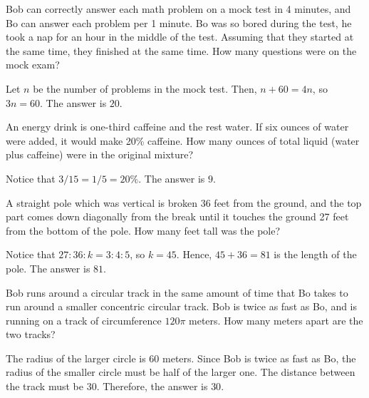 \begin{problem}
Bob can correctly answer each math problem on a mock test in 4 minutes, and Bo can answer each problem per 1 minute. Bo was so bored during the test, he took a nap for an hour in the middle of the test. Assuming that they started at the same time, they finished at the same time. How many questions were on the mock exam?
\end{problem}

\begin{solution}
Let $n$ be the number of problems in the mock test. Then, $n+60=4n$, so $3n=60$. The answer is $20$. 
\end{solution}

\begin{problem}
An energy drink is one-third caffeine and the rest water. If six ounces of water were added, it would make 20\% caffeine. How many ounces of total liquid (water plus caffeine) were in the original mixture?
\end{problem}

\begin{solution}
Notice that $3/15=1/5=20\%$. The answer is $9$. 
\end{solution}

\begin{problem}
A straight pole which was vertical is broken 36 feet from the ground, and the top part comes down diagonally from the break until it touches the ground 27 feet from the bottom of the pole. How many feet tall was the pole?
\end{problem}

\begin{solution}
Notice that $27:36:k=3:4:5$, so $k=45$. Hence, $45+36=81$ is the length of the pole. The answer is $81$.
\end{solution}

\begin{problem}
Bob runs around a circular track in the same amount of
time that Bo takes to run around a smaller concentric circular track. Bob is twice as fast as Bo, and is running on a track of circumference $120\pi$ meters. How many meters apart are the two tracks?
\end{problem}

\begin{solution}
The radius of the larger circle is $60$ meters. Since Bob is twice as fast as Bo, the radius of the smaller circle must be half of the larger one. The distance between the track must be $30$. Therefore, the answer is $30$. 
\end{solution}

